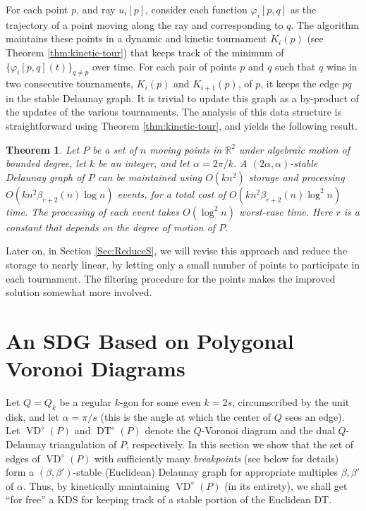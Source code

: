 \documentclass[letter,11pt]{article}
\newtheorem{theorem}{Theorem}[section]
\def \reals{{\mathbb R}}
\def\poly{\diamond}
\def\distfn{\varphi}
\def\DT{\mathop{\mathrm{DT}}}
\def\VD{\mathop{\mathrm{VD}}}
\begin{document}
For each point $p$, and ray $u_i[p]$, 
consider each function  $\distfn_i[p,q]$ as the
trajectory of a point moving
along the ray and corresponding to $q$. The algorithm maintains
these points in a dynamic and kinetic tournament $K_i(p)$ 
(see Theorem \ref{thm:kinetic-tour}) that keeps track of the 
minimum of $\{\distfn_i[p,q](t)\}_{q\neq p}$ over time.
For each pair of points $p$ and $q$ such that $q$
 wins in two consecutive tournaments, $K_i(p)$ and $K_{i+1}(p)$, of $p$,
 it keeps the edge $pq$ in
the stable Delaunay graph. It is trivial to update this graph as a by-product of the updates of the various tournaments.
The analysis of this
data structure is straightforward using Theorem \ref{thm:kinetic-tour},
and yields the following result.
\begin{theorem} \label{thm:ddj}
Let $P$ be a set of $n$ moving points in $\reals^2$ under algebraic
motion of bounded degree, let $k$ be an integer, and let $\alpha = 2\pi/k$.
A $(2\alpha,\alpha)$-stable Delaunay graph
of $P$ can be maintained using
$O(kn^2)$ storage and processing
 $O(kn^2\beta_{r+2}(n)\log n)$ events, for a total cost
of $O(kn^2\beta_{r+2}(n)\log^2 n)$ time.
The processing of each event takes
$O(\log ^2 n)$ worst-case time.
Here $r$ is a constant that depends on the degree of motion of $P$.
\end{theorem}

Later on, in Section \ref{Sec:ReduceS}, we will revise this approach and reduce the storage to nearly linear, by letting only 
a small number of points to participate in each tournament. The filtering procedure for the points makes the improved solution 
somewhat more involved.
\section{An SDG Based on Polygonal Voronoi Diagrams}
\label{sec:ViaPolygonal}
\label{Sec:polygProp}


Let $Q=Q_k$ be a regular $k$-gon
 for some even $k=2s$, circumscribed by the unit disk, and let $\alpha = \pi/s$ (this is the angle at which the center of $Q$ sees an edge). 
Let $\VD^\poly(P)$ and $\DT^\poly(P)$ denote the $Q$-Voronoi diagram and
the dual $Q$-Delaunay triangulation of $P$, respectively.
In this section we show that the set of
edges of $\VD^\poly(P)$ with sufficiently many \textit{breakpoints} (see below for details) form a
$(\beta,\beta')$-stable (Euclidean) Delaunay graph for appropriate multiples
$\beta,\beta'$ of $\alpha$.
Thus, by kinetically maintaining $\VD^\poly(P)$ (in its entirety),
we shall get ``for free'' a KDS for keeping track of a stable portion 
of the Euclidean DT.
\end{document}
